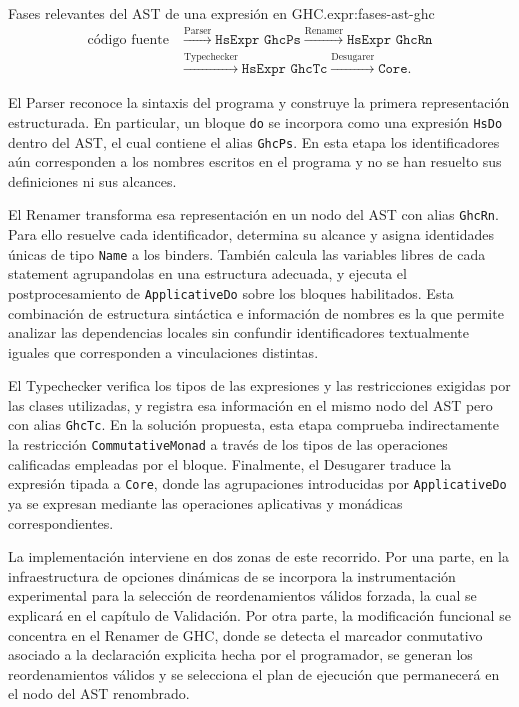 \begin{ReportExpression}{Fases relevantes del AST de una expresión en \textsf{GHC}.}{expr:fases-ast-ghc}
\[
\begin{aligned}
\text{código fuente}
&\xrightarrow{\mathrm{Parser}}
\texttt{HsExpr GhcPs}
\xrightarrow{\mathrm{Renamer}}
\texttt{HsExpr GhcRn}\\
&\xrightarrow{\mathrm{Typechecker}}
\texttt{HsExpr GhcTc}
\xrightarrow{\mathrm{Desugarer}}
\texttt{Core}.
\end{aligned}
\]
\end{ReportExpression}

El Parser reconoce la sintaxis del programa y construye la primera representación estructurada. En particular, un bloque \texttt{do} se incorpora como una expresión \texttt{HsDo} dentro del AST, el cual contiene el alias \texttt{GhcPs}. En esta etapa los identificadores aún corresponden a los nombres escritos en el programa y no se han resuelto sus definiciones ni sus alcances.

El Renamer transforma esa representación en un nodo del AST con alias \texttt{GhcRn}. Para ello resuelve cada identificador, determina su alcance y asigna identidades únicas de tipo \texttt{Name} a los binders. También calcula las variables libres de cada statement agrupandolas en una estructura adecuada, y ejecuta el postprocesamiento de \texttt{ApplicativeDo} sobre los bloques habilitados. Esta combinación de estructura sintáctica e información de nombres es la que permite analizar las dependencias locales sin confundir identificadores textualmente iguales que corresponden a vinculaciones distintas.

El Typechecker verifica los tipos de las expresiones y las restricciones exigidas por las clases utilizadas, y registra esa información en el mismo nodo del AST pero con alias \texttt{GhcTc}. En la solución propuesta, esta etapa comprueba indirectamente la restricción \texttt{CommutativeMonad} a través de los tipos de las operaciones calificadas empleadas por el bloque. Finalmente, el Desugarer traduce la expresión tipada a \texttt{Core}, donde las agrupaciones introducidas por \texttt{ApplicativeDo} ya se expresan mediante las operaciones aplicativas y monádicas correspondientes.

La implementación interviene en dos zonas de este recorrido. Por una parte, en la infraestructura de opciones dinámicas de  se incorpora la instrumentación experimental para la selección de reordenamientos válidos forzada, la cual se explicará en el capítulo de Validación. Por otra parte, la modificación funcional se concentra en el Renamer de \textsf{GHC}, donde se detecta el marcador conmutativo asociado a la declaración explicita hecha por el programador, se generan los reordenamientos válidos y se selecciona el plan de ejecución que permanecerá en el nodo del AST renombrado.

